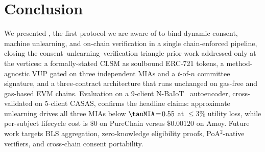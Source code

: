 \section{Conclusion}
\label{sec:conclusion}

We presented \sysname, the first protocol we are aware of to bind
dynamic consent, machine unlearning, and on-chain verification in a
single chain-enforced pipeline, closing the
consent--unlearning--verification triangle prior work addressed only at
the vertices: a formally-stated CLSM as soulbound ERC-721 tokens, a
method-agnostic VUP gated on three independent MIAs and a $t$-of-$n$
committee signature, and a three-contract architecture that runs
unchanged on gas-free and gas-based EVM chains. Evaluation on a
9-client N-BaIoT~\cite{meidan2018nbaiot} autoencoder, cross-validated
on 5-client CASAS, confirms the headline claims: approximate unlearning
drives all three MIAs below $\tauMIA\!=\!0.55$ at $\le\!3\%$ utility
loss, while per-subject lifecycle cost is $\$0$ on PureChain versus
$\$0.00120$ on Amoy. Future work targets BLS aggregation,
zero-knowledge eligibility proofs, PoA$^2$-native verifiers, and
cross-chain consent portability.
